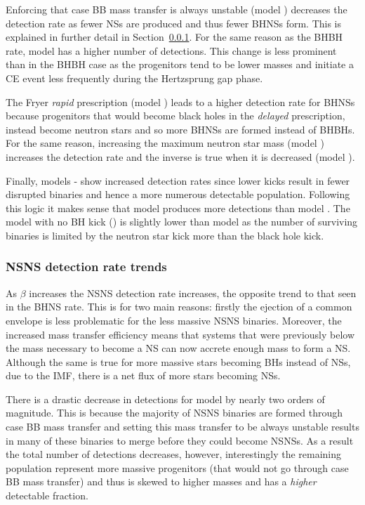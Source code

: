 Enforcing that case BB mass transfer is always unstable (model \modCaseBB{}) decreases the detection rate as fewer NSs are produced and thus fewer BHNSs form. This is explained in further detail in Section~\ref{sec:NSNS_detection_trends}. For the same reason as the BHBH rate, model \modOpt{} has a higher number of detections. This change is less prominent than in the BHBH case as the progenitors tend to be lower masses and initiate a CE event less frequently during the Hertzsprung gap phase. 

The Fryer \textit{rapid} prescription (model \modRapid{}) leads to a higher detection rate for BHNSs because progenitors that would become black holes in the \textit{delayed} prescription, instead become neutron stars and so more BHNSs are formed instead of BHBHs. For the same reason, increasing the maximum neutron star mass (model \modNSHigh{}) increases the detection rate and the inverse is true when it is decreased (model \modNSLow{}).

Finally, models \modSigLow{}-\modNoBH{} show increased detection rates since lower kicks result in fewer disrupted binaries and hence a more numerous detectable population. Following this logic it makes sense that model \modSigLower{} produces more detections than model \modSigLow{}. The model with no BH kick (\modNoBH{}) is slightly lower than model \modSigLower{} as the number of surviving binaries is limited by the neutron star kick more than the black hole kick.

\subsubsection{NSNS detection rate trends}\label{sec:NSNS_detection_trends}

As $\beta$ increases the NSNS detection rate increases, the opposite trend to that seen in the BHNS rate. This is for two main reasons: firstly the ejection of a common envelope is less problematic for the less massive NSNS binaries. Moreover, the increased mass transfer efficiency means that systems that were previously below the mass necessary to become a NS can now accrete enough mass to form a NS. Although the same is true for more massive stars becoming BHs instead of NSs, due to the IMF, there is a net flux of more stars becoming NSs.

There is a drastic decrease in detections for model \modCaseBB{} by nearly two orders of magnitude. This is because the majority of NSNS binaries are formed through case BB mass transfer and setting this mass transfer to be always unstable results in many of these binaries to merge before they could become NSNSs. As a result the total number of detections decreases, however, interestingly the remaining population represent more massive progenitors (that would not go through case BB mass transfer) and thus is skewed to higher masses and has a \textit{higher} detectable fraction.

